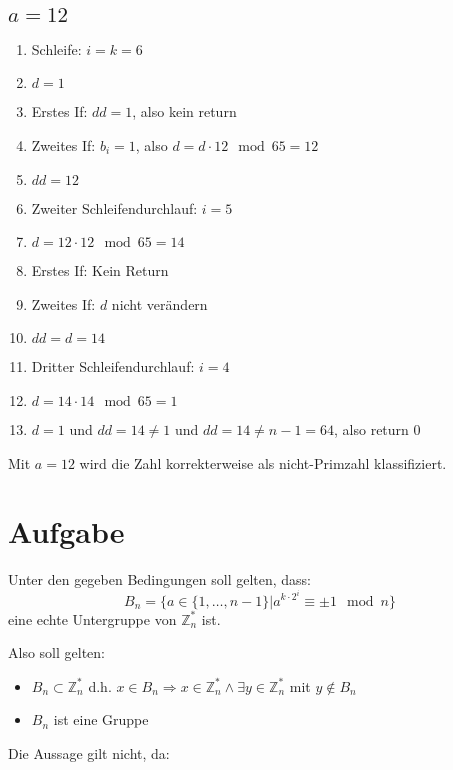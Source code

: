 \documentclass[DIN, pagenumber=false, fontsize=11pt, parskip=half]{scrartcl}
\begin{document}
    \subsection{$a=12$}
    \begin{enumerate}
        \item Schleife: $i=k=6$
        \item $d=1$
        \item Erstes If: $dd=1$, also kein return
        \item Zweites If: $b_i=1$, also $d = d \cdot 12 \mod 65 = 12$
        \item $dd = 12$
        \item Zweiter Schleifendurchlauf: $i=5$
        \item $d=12 \cdot 12 \mod 65 = 14$ 
        \item Erstes If: Kein Return
        \item Zweites If: $d$ nicht verändern
        \item $dd=d=14$
        \item Dritter Schleifendurchlauf: $i=4$
        \item $d=14 \cdot 14 \mod 65 = 1$
        \item $d=1$ und $dd = 14 \neq 1$ und $dd = 14 \neq n - 1 = 64$, also return 0
    \end{enumerate}
    Mit $a=12$ wird die Zahl korrekterweise als nicht-Primzahl klassifiziert.

    \section{Aufgabe}
    Unter den gegeben Bedingungen soll gelten, dass:
    \begin{equation}
        B_n = \{a \in \{1, \ldots, n-1\} | a^{k \cdot 2^i} \equiv \pm 1 \mod n\}
    \end{equation}
    eine echte Untergruppe von $\mathbb{Z}^*_n$ ist.

    Also soll gelten:
    \begin{itemize}
        \item $B_n \subset \mathbb{Z}^*_n$ d.h. $x \in B_n \Rightarrow x \in \mathbb{Z}^*_n \land \exists y \in \mathbb{Z}^*_n$ mit $y \notin B_n$
        \item $B_n$ ist eine Gruppe
    \end{itemize}

    \vspace{.5cm}

    Die Aussage gilt nicht, da:
    
\end{document}
